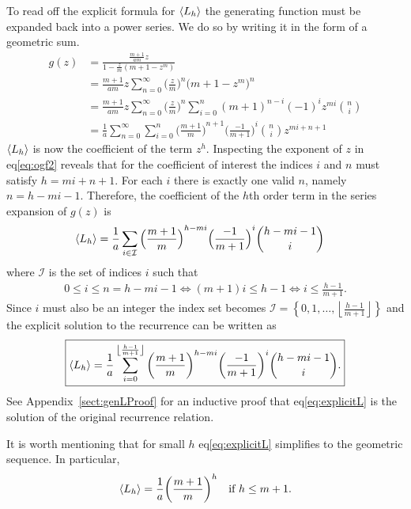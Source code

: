 To read off the explicit formula for $\left\langle L_h \right\rangle$ the generating function must be expanded back into a power series. We do so by writing it in the form of a geometric sum.
\begin{align}
	g(z) &= \frac{\frac{m+1}{am}z}{1 - \frac{z}{m}(m+1-z^m)}\nonumber\\
	&= \frac{m+1}{am}z \sum_{n=0}^\infty {\Big(\frac{z}{m}\Big)}^n {\big(m+1-z^m\big)}^n\nonumber\\
	&= \frac{m+1}{am}z \sum_{n=0}^\infty {\Big(\frac{z}{m}\Big)}^n \sum_{i=0}^{n} {(m+1)}^{n-i}{(-1)}^i z^{mi} {n \choose i}\nonumber\\
	&= \frac{1}{a} \sum_{n=0}^\infty \sum_{i=0}^{n} {\Big(\frac{m+1}{m}\Big)}^{n+1} {\Big(\frac{-1}{m+1}\Big)}^i {n \choose i}z^{mi+n+1}\label{eq:ogf2}
\end{align}
$\left\langle L_h \right\rangle$ is now the coefficient of the term $z^h$. Inspecting the exponent of $z$ in eq\ref{eq:ogf2} reveals that for the coefficient of interest the indices $i$ and $n$ must satisfy $h=mi+n+1$. For each $i$ there is exactly one valid $n$, namely $n = h-mi-1$.
Therefore, the coefficient of the $h$th order term in the series expansion of $g(z)$ is
\begin{align}
    \left\langle L_h \right\rangle &= \frac{1}{a}\sum_{i \in \mathcal{I}} {\Big(\frac{m+1}{m}\Big)}^{h-mi} {\Big(\frac{-1}{m+1}\Big)}^i {h-mi-1 \choose i} \nonumber
\end{align}
where $\mathcal{I}$ is the set of indices $i$ such that
\begin{align*}
    0 \leq i \leq n = h-mi-1
    \iff (m+1)i \leq h-1
    \iff i \leq \frac{h-1}{m+1}.
\end{align*}
Since $i$ must also be an integer the index set becomes $\mathcal{I} = \left\{0,1,\ldots,\left\lfloor{\frac{h-1}{m+1}}\right\rfloor\right\}$ and the explicit solution to the recurrence can be written as
\begin{align}
	\boxed{\left\langle L_h \right\rangle
		= \frac{1}{a}
		\sum_{i=0}^{\left\lfloor{\frac{h-1}{m+1}}\right\rfloor} {\left(\frac{m+1}{m}\right)}^{h-mi} {\left(\frac{-1}{m+1}\right)}^i {h-mi-1 \choose i}.
	}\label{eq:explicitL}
\end{align}
See Appendix~\ref{sect:genLProof} for an inductive proof that eq\ref{eq:explicitL} is the solution of the original recurrence relation.

It is worth mentioning that for small $h$ eq\ref{eq:explicitL} simplifies to the geometric sequence. In particular,
\begin{align}
	\left\langle L_h \right\rangle
		= \frac{1}{a}{\left(\frac{m+1}{m}\right)}^h \quad \mbox{if }h \leq m+1.
	\label{eq:geomL}
\end{align}
